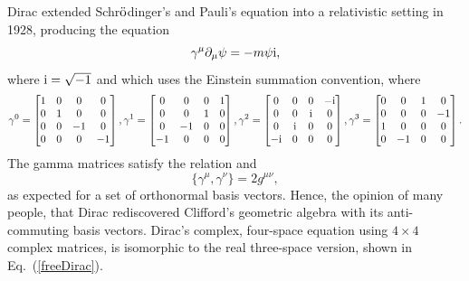 \documentclass[prb,preprint]{revtex4}
\newcommand{\be}{\begin{equation}}
\newcommand{\ee}{\end{equation}}
\begin{document}
Dirac extended Schr$\ddot{\rm{o}}$dinger's and Pauli's equation into a relativistic setting in 1928, producing the equation
\be
\gamma^{\mu} \partial_{\mu} \psi = -m  \psi {\rm{i}} ,
\ee
where $ {\rm{i}} = \sqrt{-1} $ and which uses the Einstein summation convention, where
\be
\gamma^{0} = \begin{bmatrix} 1 & 0 & 0 & 0 \\
0 & 1 & 0 & 0 \\
0 & 0 & -1 & 0 \\
0 & 0 & 0 & -1  \end{bmatrix}  , \gamma^{1} = \begin{bmatrix} 0 & 0 & 0 & 1 \\
0 & 0 & 1 & 0 \\
0 & -1 & 0 & 0 \\
-1 & 0 & 0 & 0  \end{bmatrix} , \gamma^{2} = \begin{bmatrix} 0 & 0 & 0 & -{\rm{i}} \\
0 & 0 & {\rm{i}} & 0 \\
0 & {\rm{i}} & 0 & 0 \\
-{\rm{i}} & 0 & 0 & 0  \end{bmatrix}  , \gamma^{3} = \begin{bmatrix} 0 & 0 & 1 & 0 \\
0 & 0 & 0 & -1 \\
1 & 0 & 0 & 0 \\
0 & -1 & 0 & 0  \end{bmatrix} .
\ee
The gamma matrices satisfy the relation
and
\be
\{ \gamma^{\mu} , \gamma^{\nu} \} = 2 g^{\mu \nu} ,
\ee
as expected for a set of orthonormal basis vectors.
Hence, the opinion of many people, that Dirac rediscovered Clifford's geometric algebra with its anti-commuting basis vectors.
Dirac's complex, four-space equation using $ 4 \times 4 $ complex matrices, is isomorphic to the real three-space version, shown in Eq.~(\ref{freeDirac}).





%


\end{document}
